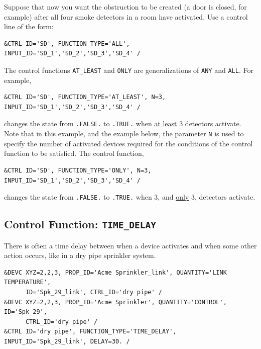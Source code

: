 \documentclass[11pt]{book}
\newcommand{\ct}{\tt\small}
\begin{document}
Suppose that now you want the obstruction to be created (a door is closed, for example) after all
four smoke detectors in a room have activated. Use a control line of the form:

\footnotesize
\begin{verbatim}
&CTRL ID='SD', FUNCTION_TYPE='ALL', INPUT_ID='SD_1','SD_2','SD_3','SD_4' /
\end{verbatim}
\normalsize

\noindent
The control functions {\ct AT\_LEAST} and {\ct ONLY} are generalizations of {\ct ANY} and {\ct ALL}. For example,

\footnotesize
\begin{verbatim}
&CTRL ID='SD', FUNCTION_TYPE='AT_LEAST', N=3, INPUT_ID='SD_1','SD_2','SD_3','SD_4' /
\end{verbatim}

\normalsize
\noindent
changes the state from {\ct .FALSE.} to {\ct .TRUE.} when \underline{at least}
3 detectors activate. Note that in this example, and the example below, the parameter {\ct N} is used to
specify the number of activated devices required for the conditions
of the control function to be satisfied. The control function,

\footnotesize
\begin{verbatim}
&CTRL ID='SD', FUNCTION_TYPE='ONLY', N=3, INPUT_ID='SD_1','SD_2','SD_3','SD_4' /
\end{verbatim}

\normalsize
\noindent
changes the state from {\ct .FALSE.} to {\ct .TRUE.} when 3,
and \underline{only} 3, detectors activate.


\subsection{Control Function: \texorpdfstring{{\tt TIME\_DELAY}}{TIME\_DELAY}}

\label{info:TIME_DELAY}

There is often a time delay between when a device activates and when some other action occurs, like in a dry pipe sprinkler system.

\footnotesize
\begin{verbatim}
&DEVC XYZ=2,2,3, PROP_ID='Acme Sprinkler_link', QUANTITY='LINK TEMPERATURE',
      ID='Spk_29_link', CTRL_ID='dry pipe' /
&DEVC XYZ=2,2,3, PROP_ID='Acme Sprinkler', QUANTITY='CONTROL', ID='Spk_29',
      CTRL_ID='dry pipe' /
&CTRL ID='dry pipe', FUNCTION_TYPE='TIME_DELAY', INPUT_ID='Spk_29_link', DELAY=30. /
\end{verbatim}
\normalsize
\end{document}
